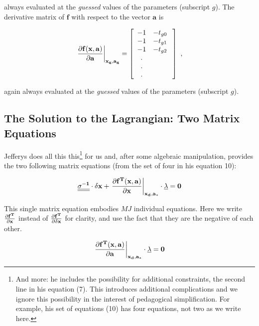 \documentclass[psfig,preprint]{aastex}
\begin{document}
\noindent always evaluated at the {\it guessed} values of the parameters
(subscript $g$).
The derivative matrix of $\mathbf{f}$
with respect to the vector $\mathbf{a}$ is

\begin{eqnarray}
\mathbf{\left.{ \partial f(x, a) \over \partial a}\right|_{x_g, a_g} }  =
\left[
\begin{array}{cc}
-1 & -t_{g0} \\
-1 & -t_{g1} \\
-1 & -t_{g2} \\
   . \\
   . \\
   . \\
\end{array}
\; \right] \ ,
\end{eqnarray}

\noindent again always evaluated at the {\it guessed} values of the parameters
(subscript $g$).

\subsection{The Solution to the Lagrangian: Two Matrix Equations}

Jefferys does all this this\footnote{And more: he includes the
possibility for additional constraints, the second line in his equation
(7).  This introduces additional complications and we ignore this
possibility in the interest of pedagogical simplification.  For example,
his set of equations (10) has four equations, not two as we write here.}
for us and, after some algebraic manipulation, provides the two
following matrix equations (from the set of four in his equation 10):

\begin{mathletters}
\begin{equation} \label{feqn0}
\mathbf{\underline{\underline{\sigma^{-1}}} \cdot \delta x + 
  \left.{\partial f^T(x, a) \over \partial x} \right|_{x_d, a_*} 
  \cdot \underline{\lambda} = 0}
\end{equation}

\noindent This single matrix equation embodies $MJ$ individual
equations. Here we write $\mathbf{\partial f^T \over \partial x}$ instead
of $\mathbf{\partial f^T \over \partial \delta x}$ for clarity, and use
the fact that they are the negative of each other. 

\begin{equation} \label{feqn1}
\mathbf{\left.{\partial f^T(x, a) \over \partial a} \right|_{x_d, a_*} \cdot 
  \underline{\lambda} = 0}
\end{equation}
\end{mathletters}
\end{document}
